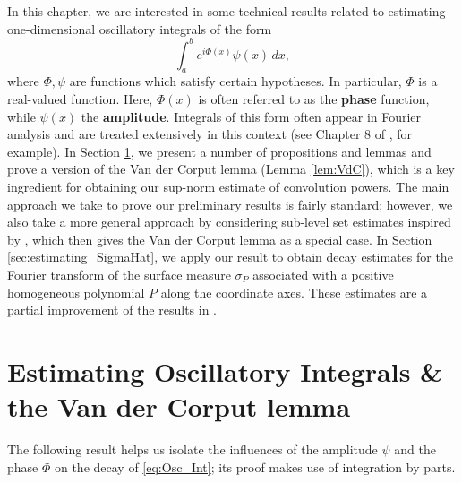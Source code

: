\documentclass[11pt, letter]{book}
\begin{document}
In this chapter, we are interested in some technical results related to estimating one-dimensional oscillatory integrals of the form 
\begin{equation}\label{eq:Osc_Int}
    \int^b_a e^{i \Phi(x)}\psi(x)\,dx,
\end{equation}
where $\Phi, \psi$ are functions which satisfy certain hypotheses. In particular, $\Phi$ is a real-valued function. Here, $\Phi(x)$ is often referred to as the {\textbf{phase}} function, while $\psi(x)$ the \textbf{amplitude}. Integrals of this form often appear in Fourier analysis and are treated extensively in this context (see Chapter 8 of \cite{SteinFunctionalAnalysis}, for example). In Section \ref{sec:Estimate_OscInt}, we present a number of propositions and lemmas and prove a version of the Van der Corput lemma (Lemma \ref{lem:VdC}), which is a key ingredient for obtaining our sup-norm estimate of convolution powers. The main approach we take to prove our preliminary results is fairly standard; however, we also take a more general approach by considering sub-level set estimates inspired by \cite{phd_thesis}, which then gives the Van der Corput lemma as a special case. In Section \ref{sec:estimating_SigmaHat}, we apply our result to obtain decay estimates for the Fourier transform of the surface measure $\sigma_P$ associated with a positive homogeneous polynomial $P$ along the coordinate axes. These estimates are a partial improvement of the results in \cite{greenblatt_fourier_2021}.
















\section{Estimating Oscillatory Integrals \& the Van der Corput lemma}\label{sec:Estimate_OscInt}


\noindent The following result helps us isolate the influences of the amplitude $\psi$ and the phase $\Phi$ on the decay of \eqref{eq:Osc_Int}; its proof makes use of integration by parts.
\end{document}
